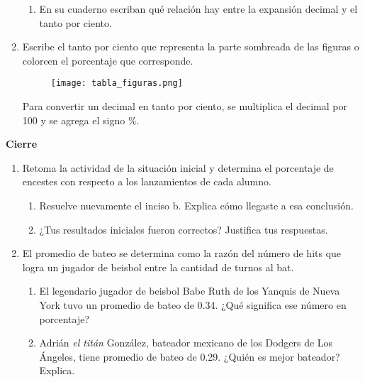 \begin{enumerate}
          \begin{enumerate}
              \item En su cuaderno escriban qué relación hay entre la expansión decimal y el tanto por
                    ciento.
          \end{enumerate}
    \item Escribe el tanto por ciento que representa la parte sombreada de las
          figuras o coloreen el porcentaje que corresponde.
          \begin{figure}[H]
              \centering
              \texttt{[image: tabla\_figuras.png]}
              \label{fig:tabla_figuras}
          \end{figure}
          \begin{boxH}
              Para convertir un decimal en tanto por ciento, se multiplica el decimal por 100 y
              se agrega el signo \%.
          \end{boxH}
\end{enumerate}

\begin{boxK}
    \begin{center}\textbf{Cierre}\end{center}

    \begin{enumerate}
        \item Retoma la actividad de la situación inicial y determina el porcentaje de encestes
              con respecto a los lanzamientos de cada alumno.
              \begin{enumerate}
                  \item Resuelve nuevamente el inciso b. Explica cómo llegaste a esa conclusión.
                  \item ¿Tus resultados iniciales fueron correctos? Justifica tus respuestas.
              \end{enumerate}
        \item El promedio de bateo se determina como la razón del número de hits que logra
              un jugador de beisbol entre la cantidad de turnos al bat.\\
              \begin{enumerate}
                  \item  El legendario jugador de beisbol Babe Ruth de los Yanquis de Nueva York tuvo
                        un promedio de bateo de 0.34. ¿Qué significa ese número en porcentaje?
                  \item Adrián \emph{el titán} González, bateador mexicano de los Dodgers de Los Ángeles,
                        tiene promedio de bateo de 0.29. ¿Quién es mejor bateador? Explica.
              \end{enumerate}
    \end{enumerate}
\end{boxK}
\newpage
